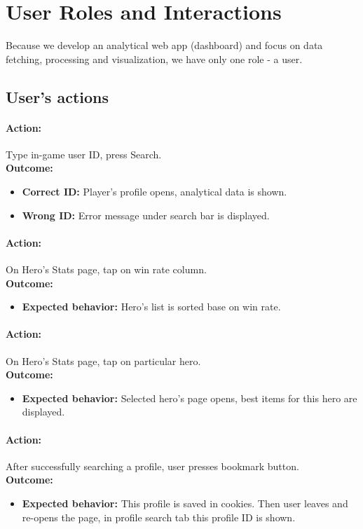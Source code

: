 \section{User Roles and Interactions}
Because we develop an analytical web app (dashboard) and focus on data fetching, processing and visualization,
we have only one role - a user.

\subsection{User's actions}

\paragraph{Action:} Type in-game user ID, press Search.
\\
\textbf{Outcome:}
    \begin{itemize}
        \item \textbf{Correct ID:} Player’s profile opens, analytical data is shown.
        \item \textbf{Wrong ID:} Error message under search bar is displayed.
    \end{itemize}



\paragraph{Action:} On Hero's Stats page, tap on win rate column.
\\
\textbf{Outcome:}
    \begin{itemize}
        \item \textbf{Expected behavior:}  Hero's list is sorted base on win rate.
    \end{itemize}

\paragraph{Action:} On Hero's Stats page, tap on particular hero.
\\
\textbf{Outcome:}
\begin{itemize}
    \item \textbf{Expected behavior:} Selected hero's page opens, best items for this hero are displayed.
\end{itemize}

\paragraph{Action:} After successfully searching a profile, user presses bookmark button.
\\
\textbf{Outcome:}
\begin{itemize}
    \item \textbf{Expected behavior:} This profile is saved in cookies.
    Then user leaves and re-opens the page, in profile search tab this profile ID is shown.
\end{itemize}
